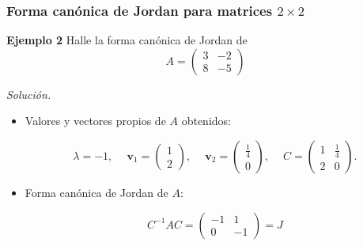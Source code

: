 \begin{frame}\frametitle{Forma canónica de Jordan para matrices $2\times 2$}
	
	\begin{ej}{\textbf{Ejemplo 2}} \justifying
		Halle la forma canónica de Jordan de
		\[
		A = 
		\left(
		\begin{array}{cc}
		3 & -2 \\[1mm]
		8 & -5
		\end{array}
		\right)
		\]
	\end{ej}
	
	\textit{Solución.}
	
	\vspace{2mm}
	\begin{itemize}
		\item Valores y vectores propios de $A$ obtenidos:
		
		\vspace{1mm}	
		\[
		\lambda = -1,
		\quad \
		\mathbf{v}_1 = 
		\left(
		\begin{array}{c}
		1 \\[1mm]
		2
		\end{array}
		\right),
		\quad \
		\mathbf{v}_2 = 
		\left(
		\begin{array}{c}
		\frac{1}{4} \\[1mm]
		0
		\end{array}
		\right),
		\quad \
		C = 
		\left(
		\begin{array}{cc}
		1 & \frac{1}{4} \\[1mm]
		2 & 0
		\end{array}
		\right).
		\]
								
		\vspace{3mm}	
		\item Forma canónica de Jordan de $A$:
		
		\vspace{0mm}	
		\[
		C^{-1}AC
		= 
		\left(
		\begin{array}{rr}
		-1 & 1 \\[1mm]
		 0 & -1
		\end{array}
		\right)
		= J
		\]
		
	\end{itemize}
	
\end{frame}


\subsection{} 

